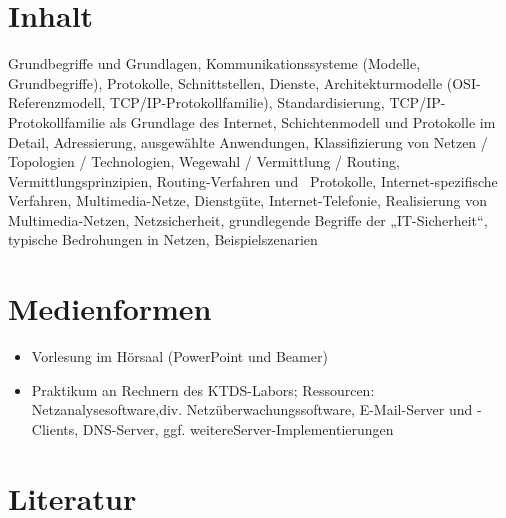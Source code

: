 \hypertarget{inhaltpathlabel....srcmodulbeschreibungen-bachelor-bpo5ba_kommunikationstechnikundnetze}{%
\section*{Inhalt\label{../../src/modulbeschreibungen-bachelor-bpo5/BA_KommunikationstechnikundNetze}}\label{inhaltpathlabel....srcmodulbeschreibungen-bachelor-bpo5ba_kommunikationstechnikundnetze}}

Grundbegriffe und Grundlagen, Kommunikationssysteme (Modelle,
Grundbegriffe), Protokolle, Schnittstellen, Dienste, Architekturmodelle
(OSI-Referenzmodell, TCP/IP-Protokollfamilie), Standardisierung,
TCP/IP-Protokollfamilie als Grundlage des Internet, Schichtenmodell und
Protokolle im Detail, Adressierung, ausgewählte Anwendungen,
Klassifizierung von Netzen / Topologien / Technologien, Wegewahl /
Vermittlung / Routing, Vermittlungsprinzipien, Routing-Verfahren und~
Protokolle, Internet-spezifische Verfahren, Multimedia-Netze,
Dienstgüte, Internet-Telefonie, Realisierung von Multimedia-Netzen,
Netzsicherheit, grundlegende Begriffe der „IT-Sicherheit``, typische
Bedrohungen in Netzen, Beispielszenarien

\hypertarget{medienformenpathlabel....srcmodulbeschreibungen-bachelor-bpo5ba_kommunikationstechnikundnetze}{%
\section*{Medienformen\label{../../src/modulbeschreibungen-bachelor-bpo5/BA_KommunikationstechnikundNetze}}\label{medienformenpathlabel....srcmodulbeschreibungen-bachelor-bpo5ba_kommunikationstechnikundnetze}}

\begin{itemize}
\tightlist
\item
  Vorlesung im Hörsaal (PowerPoint und Beamer)
\item
  Praktikum an Rechnern des KTDS-Labors; Ressourcen:
  Netzanalysesoftware,div. Netzüberwachungssoftware, E-Mail-Server und
  -Clients, DNS-Server, ggf. weitereServer-Implementierungen
\end{itemize}

\hypertarget{literaturpathlabel....srcmodulbeschreibungen-bachelor-bpo5ba_kommunikationstechnikundnetze}{%
\section*{Literatur\label{../../src/modulbeschreibungen-bachelor-bpo5/BA_KommunikationstechnikundNetze}}\label{literaturpathlabel....srcmodulbeschreibungen-bachelor-bpo5ba_kommunikationstechnikundnetze}}

